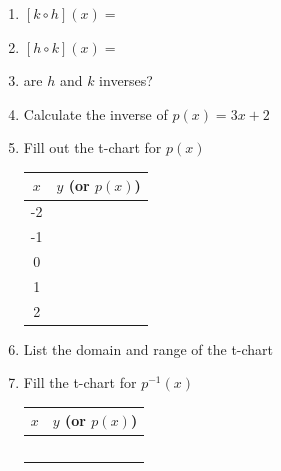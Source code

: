 \documentclass[12pt]{article}
\begin{document}
\begin{enumerate}[resume]
	\setlength\itemsep{1cm}
	
	\item $[k\circ h](x)=$\\
	
	\item $[h \circ k](x)=$\\
	
	\item are $h$ and $k$ inverses?\\
	
	
	\item Calculate the inverse of $p(x)=3x+2$\\
	
		\vspace{1in}
		
	\item Fill out the t-chart for $p(x)$
	
	\begin{center}
	\begin{tabular}{c | c}
	
		\hspace{.5cm}$x$ \hspace{.5cm} & $y$ (or $p(x)$) \\ \hline
	
		-2 & \\
		 
		-1 & \\
		
		0 &  \\
		
		1 &  \\
		
		2 &  \\
	
	\end{tabular}
	\end{center}
	
	\item List the domain and range of the t-chart\\
	
	\item Fill the t-chart for $p^{-1}(x)$\\
		\begin{center}
		\begin{tabular}{c | c}
	
		\hspace{.5cm}$x$ \hspace{.5cm} & $y$ (or $p(x)$) \\ \hline
	
		& \\
		 
		& \\
		
		&  \\
		
		&  \\
		
		&  \\
	
	\end{tabular}
	\end{center}	
\end{enumerate}
\end{document}
